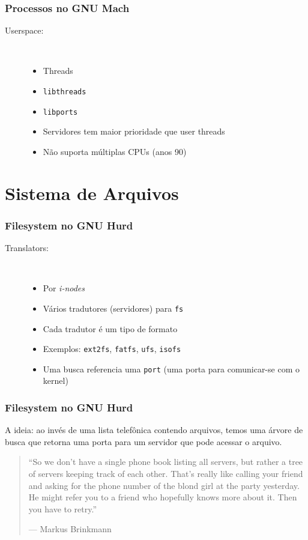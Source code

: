 \documentclass[10pt]{beamer}
\theoremstyle{plain}
\newcommand{\code}[1]{\lstinline[mathescape=true]{#1}}
\begin{document}
\begin{frame}
  \frametitle{Processos no GNU Mach}
  \begin{description}
    \item[Userspace:]~\\
      \begin{itemize}
        \item Threads
        \item \code{libthreads}
        \item \code{libports}
        \item Servidores tem maior prioridade que user threads
        \item Não suporta múltiplas CPUs (anos 90)
      \end{itemize}
  \end{description}
\end{frame}

\section{Sistema de Arquivos}

\begin{frame}
  \frametitle{Filesystem no GNU Hurd}
  \begin{description}
    \item[Translators:]~\\
    \begin{itemize}
      \item Por \textit{i-nodes}
      \item Vários tradutores (servidores) para \code{fs}
      \item Cada tradutor é um tipo de formato
      \item Exemplos: \code{ext2fs}, \code{fatfs}, \code{ufs}, \code{isofs}
      \item Uma busca referencia uma \code{port} (uma porta para comunicar-se com o kernel)
    \end{itemize}
  \end{description}
\end{frame}

\begin{frame}
  \frametitle{Filesystem no GNU Hurd}
  A ideia: ao invés de uma lista telefônica contendo arquivos, temos uma árvore de busca que
  retorna uma porta para um servidor que pode acessar o arquivo.

  \begin{quote}
    ``So we don't have a single phone book listing all servers, but rather a tree of servers
    keeping track of each other. That's really like calling your friend and asking for the phone
    number of the blond girl at the party yesterday. He might refer you to a friend who hopefully
    knows more about it. Then you have to retry.''

    \hfill --- Markus Brinkmann
  \end{quote}
\end{frame}
\end{document}
